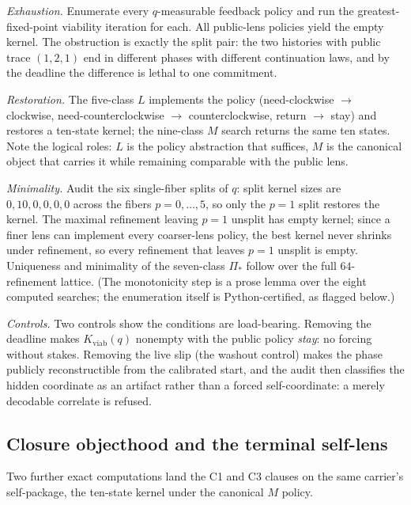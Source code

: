 \documentclass[11pt]{article}
\newcommand{\Kviab}{K_{\mathrm{viab}}}
\theoremstyle{definition}
\begin{document}
\emph{Exhaustion.} Enumerate every $q$-measurable feedback policy and run the
greatest-fixed-point viability iteration for each. All public-lens policies
yield the empty kernel. The obstruction is exactly the split pair: the two
histories with public trace $(1,2,1)$ end in different phases with different
continuation laws, and by the deadline the difference is lethal to one
commitment.

\emph{Restoration.} The five-class $L$ implements the policy
(need-clockwise $\to$ clockwise, need-counterclockwise $\to$
counterclockwise, return $\to$ stay) and restores a ten-state kernel; the
nine-class $M$ search returns the same ten states. Note the logical roles:
$L$ is the policy abstraction that suffices, $M$ is the canonical object that
carries it while remaining comparable with the public lens.

\emph{Minimality.} Audit the six single-fiber splits of $q$: split kernel
sizes are $0, 10, 0, 0, 0, 0$ across the fibers $p = 0, \dots, 5$, so only the
$p=1$ split restores the kernel. The maximal refinement leaving $p=1$ unsplit
has empty kernel; since a finer lens can implement every coarser-lens policy,
the best kernel never shrinks under refinement, so every refinement that
leaves $p=1$ unsplit is empty. Uniqueness and minimality of the seven-class
$\Pi_*$ follow over the full $64$-refinement lattice. (The monotonicity step
is a prose lemma over the eight computed searches; the enumeration itself is
Python-certified, as flagged below.)

\emph{Controls.} Two controls show the conditions are load-bearing. Removing
the deadline makes $\Kviab(q)$ nonempty with the public policy \emph{stay}:
no forcing without stakes. Removing the live slip (the washout control) makes
the phase publicly reconstructible from the calibrated start, and the audit
then classifies the hidden coordinate as an artifact rather than a forced
self-coordinate: a merely decodable correlate is refused.

\subsection{Closure objecthood and the terminal self-lens}
\label{sec:t1c1c3}

Two further exact computations land the C1 and C3 clauses on the same
carrier's self-package, the ten-state kernel under the canonical $M$
policy.
\end{document}
